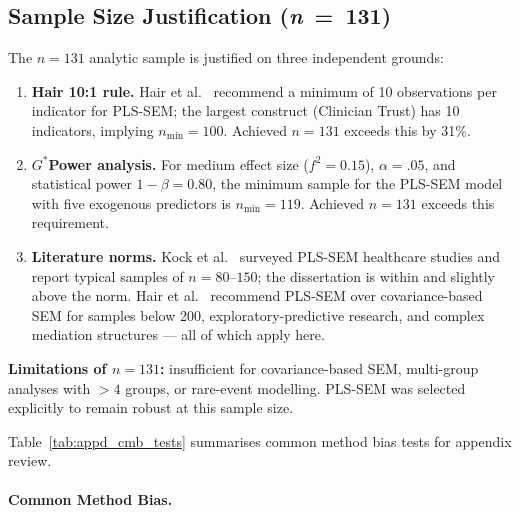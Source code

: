 \subsection*{Sample Size Justification (\textit{n}~=~131)}
\label{sec:appd_sample_size}

\noindent The $n=131$ analytic sample is justified on three independent grounds:

\begin{enumerate}[leftmargin=*, itemsep=2pt]
    \item \textbf{Hair 10:1 rule.} Hair et al.~\cite{hair2019multivariate} recommend a minimum of 10 observations per indicator for PLS-SEM; the largest construct (Clinician Trust) has 10 indicators, implying $n_{\min} = 100$. Achieved $n=131$ exceeds this by 31\%.
    \item \textbf{$G^*$Power analysis.} For medium effect size ($f^2 = 0.15$), $\alpha = .05$, and statistical power $1-\beta = 0.80$, the minimum sample for the PLS-SEM model with five exogenous predictors is $n_{\min} = 119$. Achieved $n=131$ exceeds this requirement.
    \item \textbf{Literature norms.} Kock et al.~\cite{kock2018minimum} surveyed PLS-SEM healthcare studies and report typical samples of $n=80$--$150$; the dissertation is within and slightly above the norm. Hair et al.~\cite{hair2019multivariate} recommend PLS-SEM over covariance-based SEM for samples below 200, exploratory-predictive research, and complex mediation structures --- all of which apply here.
\end{enumerate}

\noindent\textbf{Limitations of $n=131$:} insufficient for covariance-based SEM, multi-group analyses with $> 4$ groups, or rare-event modelling. PLS-SEM was selected explicitly to remain robust at this sample size.

\noindent Table~\ref{tab:appd_cmb_tests} summarises common method bias tests for appendix review.

\paragraph{Common Method Bias.}




